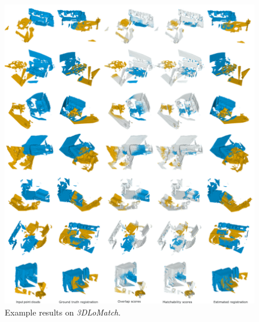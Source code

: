 \begin{figure}[t]
    \centering
    \includegraphics[width=\textwidth]{figures/images/3dmatch_supp.jpg}
    \caption{Example results on \emph{3DLoMatch}.}
    \label{fig:3dmatch_supp}
\end{figure}